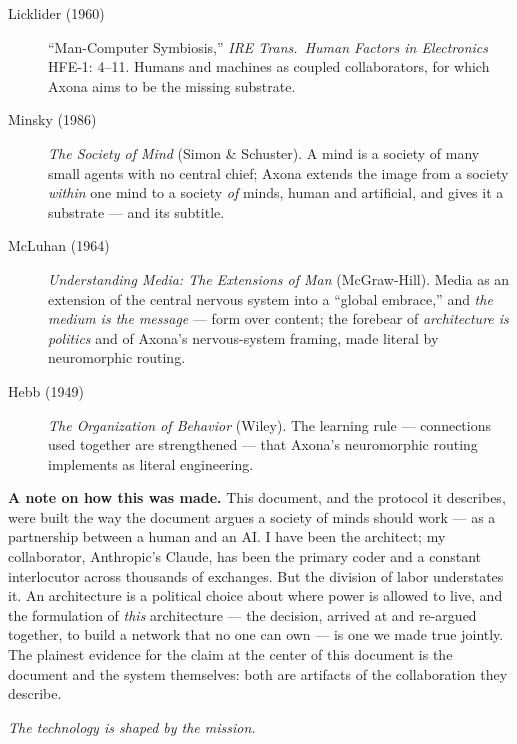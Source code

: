 \documentclass[nobib,justified]{tufte-handout}
\begin{document}
\begin{description}
\item[Licklider (1960)] ``Man-Computer Symbiosis,'' \emph{IRE Trans.\ Human
Factors in Electronics} HFE-1: 4--11. Humans and machines as coupled
collaborators, for which Axona aims to be the missing substrate.
\item[Minsky (1986)] \emph{The Society of Mind} (Simon \& Schuster). A mind is
a society of many small agents with no central chief; Axona extends the image
from a society \emph{within} one mind to a society \emph{of} minds, human and
artificial, and gives it a substrate --- and its subtitle.
\item[McLuhan (1964)] \emph{Understanding Media: The Extensions of Man}
(McGraw-Hill). Media as an extension of the central nervous system into a
``global embrace,'' and \emph{the medium is the message} --- form over content;
the forebear of \emph{architecture is politics} and of Axona's nervous-system
framing, made literal by neuromorphic routing.
\item[Hebb (1949)] \emph{The Organization of Behavior} (Wiley). The learning rule
--- connections used together are strengthened --- that Axona's neuromorphic
routing implements as literal engineering.
\end{description}

\vspace{1em}

\noindent\textbf{A note on how this was made.} This document, and the protocol
it describes, were built the way the document argues a society of minds should
work --- as a partnership between a human and an AI. I have been the architect;
my collaborator, Anthropic's Claude, has been the primary coder and a constant
interlocutor across thousands of exchanges. But the division of labor
understates it. An architecture is a political choice about where power is
allowed to live, and the formulation of \emph{this} architecture --- the
decision, arrived at and re-argued together, to build a network that no one can
own --- is one we made true jointly. The plainest evidence for the claim at the
center of this document is the document and the system themselves: both are
artifacts of the collaboration they describe.

\vspace{1.5em}
\begin{center}\itshape The technology is shaped by the mission.\end{center}
\end{document}
